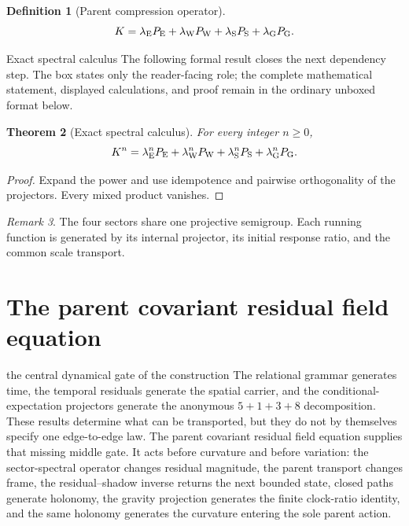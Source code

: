 \documentclass[11pt]{article}
\numberwithin{equation}{section}
\newtheorem{definition}{Definition}[section]
\newtheorem{theorem}[definition]{Theorem}
\theoremstyle{remark}
\newtheorem{remark}[definition]{Remark}
\newcommand{\Pg}{P_{\mathrm G}}
\newcommand{\Pe}{P_{\mathrm E}}
\newcommand{\Pw}{P_{\mathrm W}}
\newcommand{\Ps}{P_{\mathrm S}}
\begin{document}
\begin{definition}[Parent compression operator]
\begin{equation}
K=\lambda_{\rm E}\Pe+\lambda_{\rm W}\Pw+\lambda_{\rm S}\Ps+\lambda_{\rm G}\Pg.
\end{equation}
\end{definition}

\begin{proofguide}{Exact spectral calculus}
The following formal result closes the next dependency step. The box states only the reader-facing role; the complete mathematical statement, displayed calculations, and proof remain in the ordinary unboxed format below.
\end{proofguide}
\begin{theorem}[Exact spectral calculus]
For every integer $n\ge0$,
\begin{equation}
K^n=\lambda_{\rm E}^n\Pe+\lambda_{\rm W}^n\Pw+\lambda_{\rm S}^n\Ps+\lambda_{\rm G}^n\Pg.
\end{equation}
\end{theorem}
\begin{proof}
Expand the power and use idempotence and pairwise orthogonality of the projectors. Every mixed product vanishes.
\end{proof}

\begin{remark}
The four sectors share one projective semigroup. Each running function is generated by its internal projector, its initial response ratio, and the common scale transport.
\end{remark}


\section{The parent covariant residual field equation}
\label{sec:covariantresidual}
\begin{conceptledger}{the central dynamical gate of the construction}
The relational grammar generates time, the temporal residuals generate the spatial carrier, and the conditional-expectation projectors generate the anonymous $5+1+3+8$ decomposition.  These results determine what can be transported, but they do not by themselves specify one edge-to-edge law.  The parent covariant residual field equation supplies that missing middle gate.  It acts before curvature and before variation: the sector-spectral operator changes residual magnitude, the parent transport changes frame, the residual--shadow inverse returns the next bounded state, closed paths generate holonomy, the gravity projection generates the finite clock-ratio identity, and the same holonomy generates the curvature entering the sole parent action.
\end{conceptledger}
\end{document}
